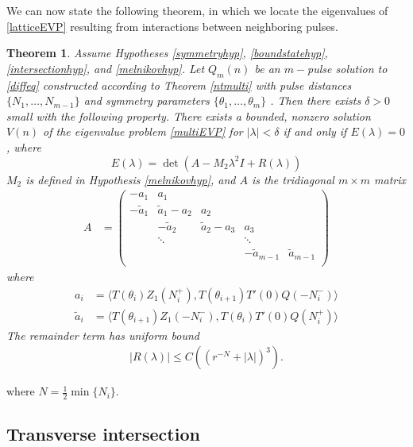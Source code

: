\documentclass[12pt]{article}
\newtheorem{theorem}{Theorem}
\begin{document}
We can now state the following theorem, in which we locate the eigenvalues of \eqref{latticeEVP} resulting from interactions between neighboring pulses.

\begin{theorem}\label{stabilitytheorem}
Assume Hypotheses \ref{symmetryhyp}, \ref{boundstatehyp}, \ref{intersectionhyp}, and \ref{melnikovhyp}. Let $Q_m(n)$ be an $m-$pulse solution to \eqref{diffeq} constructed according to Theorem \ref{ntmulti} with pulse distances $\{ N_1, \dots, N_{m-1}\}$ and symmetry parameters $\{\theta_1, \dots, \theta_m\}$ 
. Then there exists $\delta > 0$ small with the following property. There exists a bounded, nonzero solution $V(n)$ of the eigenvalue problem \eqref{multiEVP} for $|\lambda| < \delta$ if and only if $E(\lambda) = 0$, where
\begin{equation}\label{Elambda}
E(\lambda) = \det(A - M_2 \lambda^2 I + R(\lambda))
\end{equation}
$M_2$ is defined in Hypothesis \ref{melnikovhyp}, and $A$ is the tridiagonal $m \times m$ matrix
\begin{align}\label{matrixA}
A &= \begin{pmatrix}
-a_1 & a_1 & & & \\
-\tilde{a}_1 & \tilde{a}_1 - a_2 & a_2 \\
& -\tilde{a}_2 & \tilde{a}_2 - a_3 & a_3 \\
& \ddots & & \ddots \\
& & & -\tilde{a}_{m-1} & \tilde{a}_{m-1}  \\
\end{pmatrix}
\end{align}
where
\begin{align*}
a_i &= \langle T(\theta_i) Z_1(N_i^+), T(\theta_{i+1}) T'(0)Q(-N_i^-) \rangle \\
\tilde{a}_i &= \langle T(\theta_{i+1}) Z_1(-N_i^-), T(\theta_i) T'(0)Q(N_i^+) \rangle
\end{align*}
The remainder term has uniform bound
\begin{align}\label{Rbound2}
|R(\lambda)| \leq C\left( (r^{-N} + |\lambda|)^3 \right).
\end{align}
\end{theorem}
where $N = \frac{1}{2}\min\{N_i\}$.

\subsection{Transverse intersection}
\end{document}
